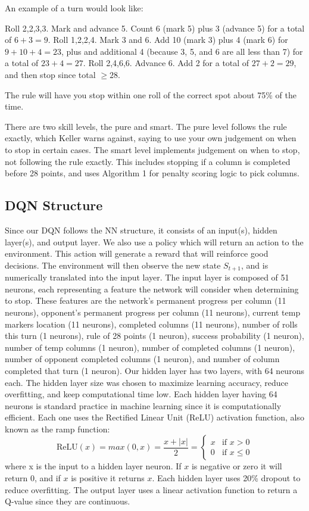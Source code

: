 \documentclass[12pt]{article}
\begin{document}
\begin{thesis}
An example of a turn would look like:

Roll 2,2,3,3.
Mark and advance 5.
Count 6 (mark 5) plus 3 (advance 5) for a total of \(6+3=9\).
Roll 1,2,2,4.
Mark 3 and 6.
Add 10 (mark 3) plus 4 (mark 6) for \(9+10+4=23\), plus and additional 4 (because 3, 5, and 6 are all less than 7) for a total of \(23+4=27\).
Roll 2,4,6,6.
Advance 6.
Add 2 for a total of \(27+2=29\), and then stop since total \(\ge28\).

\noindent The rule will have you stop within one roll of the correct spot about 75\% of the time.

There are two skill levels, the pure and smart.
The pure level follows the rule exactly, which Keller warns against, saying to use your own judgement on when to stop in certain cases.
The smart level implements judgement on when to stop, not following the rule exactly.
This includes stopping if a column is completed before 28 points, and uses Algorithm 1 for penalty scoring logic to pick columns.

\subsection{DQN Structure}\label{dqn-structure}

Since our DQN follows the NN structure, it consists of an input(s), hidden layer(s), and output layer.
We also use a policy which will return an action to the environment.
This action will generate a reward that will reinforce good decisions.
The environment will then observe the new state \(S_{t+1}\), and is numerically translated into the input layer.
The input layer is composed of 51 neurons, each representing a feature the network will consider when determining to stop.
These features are the network's permanent progress per column (11 neurons), opponent's permanent progress per column (11 neurons), current temp markers location (11 neurons), completed columns (11 neurons), number of rolls this turn (1 neurons), rule of 28 points (1 neuron), success probability (1 neuron), number of temp columns (1 neuron), number of completed columns (1 neuron), number of opponent completed columns (1 neuron), and number of column completed that turn (1 neuron).
Our hidden layer has two layers, with 64 neurons each.
The hidden layer size was chosen to maximize learning accuracy, reduce overfitting, and keep computational time low.
Each hidden layer having 64 neurons is standard practice in machine learning since it is computationally efficient.
Each one uses the Rectified Linear Unit (ReLU) activation function, also known as the ramp function: \[\text{ReLU}(x)=max(0,x)=\frac{x+|x|}{2}={\begin{cases}x&{\text{if }}x>0\\0&\text{if }x\leq 0\end{cases}}\]where x is the input to a hidden layer neuron.
If \(x\) is negative or zero it will return \(0\), and if \(x\) is positive it returns \(x\).
Each hidden layer uses 20\% dropout to reduce overfitting.
The output layer uses a linear activation function to return a Q-value since they are continuous.


\end{thesis}
\end{document}
